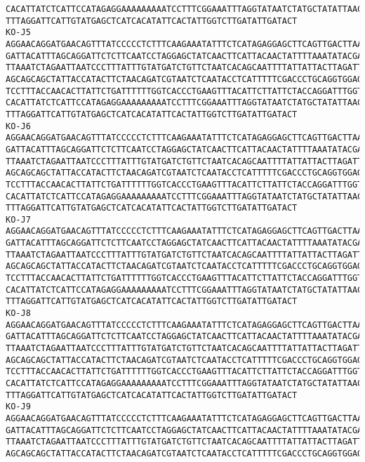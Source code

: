 \documentclass[11pt]{article}
\begin{document}
\begin{Verbatim}[commandchars=\\\{\}]
CACATTATCTCATTCCATAGAGGAAAAAAAAATCCTTTCGGAAATTTAGGTATAATCTATGCTATATTAACTATTGGAAT
TTTAGGATTCATTGTATGAGCTCATCACATATTCACTATTGGTCTTGATATTGATACT
KO-J5
AGGAACAGGATGAACAGTTTATCCCCCTCTTTCAAGAAATATTTCTCATAGAGGAGCTTCAGTTGACTTAAGAATCTTCA
GATTACATTTAGCAGGATTCTCTTCAATCCTAGGAGCTATCAACTTCATTACAACTATTTTAAATATACGACCAAAAAAC
TTAAATCTAGAATTAATCCCTTTATTTGTATGATCTGTTCTAATCACAGCAATTTTATTATTACTTAGATTACCAGTCTT
AGCAGCAGCTATTACCATACTTCTAACAGATCGTAATCTCAATACCTCATTTTTCGACCCTGCAGGTGGAGGAGACCCAA
TCCTTTACCAACACTTATTCTGATTTTTTGGTCACCCTGAAGTTTACATTCTTATTCTACCAGGATTTGGTATTATTTCT
CACATTATCTCATTCCATAGAGGAAAAAAAAATCCTTTCGGAAATTTAGGTATAATCTATGCTATATTAACTATTGGAAT
TTTAGGATTCATTGTATGAGCTCATCACATATTCACTATTGGTCTTGATATTGATACT
KO-J6
AGGAACAGGATGAACAGTTTATCCCCCTCTTTCAAGAAATATTTCTCATAGAGGAGCTTCAGTTGACTTAAGAATCTTCA
GATTACATTTAGCAGGATTCTCTTCAATCCTAGGAGCTATCAACTTCATTACAACTATTTTAAATATACGACCAAAAAAC
TTAAATCTAGAATTAATCCCTTTATTTGTATGATCTGTTCTAATCACAGCAATTTTATTATTACTTAGATTACCAGTCTT
AGCAGCAGCTATTACCATACTTCTAACAGATCGTAATCTCAATACCTCATTTTTCGACCCTGCAGGTGGAGGAGACCCAA
TCCTTTACCAACACTTATTCTGATTTTTTGGTCACCCTGAAGTTTACATTCTTATTCTACCAGGATTTGGTATTATTTCT
CACATTATCTCATTCCATAGAGGAAAAAAAAATCCTTTCGGAAATTTAGGTATAATCTATGCTATATTAACTATTGGAAT
TTTAGGATTCATTGTATGAGCTCATCACATATTCACTATTGGTCTTGATATTGATACT
KO-J7
AGGAACAGGATGAACAGTTTATCCCCCTCTTTCAAGAAATATTTCTCATAGAGGAGCTTCAGTTGACTTAAGAATCTTCA
GATTACATTTAGCAGGATTCTCTTCAATCCTAGGAGCTATCAACTTCATTACAACTATTTTAAATATACGACCAAAAAAC
TTAAATCTAGAATTAATCCCTTTATTTGTATGATCTGTTCTAATCACAGCAATTTTATTATTACTTAGATTACCAGTCTT
AGCAGCAGCTATTACCATACTTCTAACAGATCGTAATCTCAATACCTCATTTTTCGACCCTGCAGGTGGAGGAGACCCAA
TCCTTTACCAACACTTATTCTGATTTTTTGGTCACCCTGAAGTTTACATTCTTATTCTACCAGGATTTGGTATTATTTCT
CACATTATCTCATTCCATAGAGGAAAAAAAAATCCTTTCGGAAATTTAGGTATAATCTATGCTATATTAACTATTGGAAT
TTTAGGATTCATTGTATGAGCTCATCACATATTCACTATTGGTCTTGATATTGATACT
KO-J8
AGGAACAGGATGAACAGTTTATCCCCCTCTTTCAAGAAATATTTCTCATAGAGGAGCTTCAGTTGACTTAAGAATCTTCA
GATTACATTTAGCAGGATTCTCTTCAATCCTAGGAGCTATCAACTTCATTACAACTATTTTAAATATACGACCAAAAAAC
TTAAATCTAGAATTAATCCCTTTATTTGTATGATCTGTTCTAATCACAGCAATTTTATTATTACTTAGATTACCAGTCTT
AGCAGCAGCTATTACCATACTTCTAACAGATCGTAATCTCAATACCTCATTTTTCGACCCTGCAGGTGGAGGAGACCCAA
TCCTTTACCAACACTTATTCTGATTTTTTGGTCACCCTGAAGTTTACATTCTTATTCTACCAGGATTTGGTATTATTTCT
CACATTATCTCATTCCATAGAGGAAAAAAAAATCCTTTCGGAAATTTAGGTATAATCTATGCTATATTAACTATTGGAAT
TTTAGGATTCATTGTATGAGCTCATCACATATTCACTATTGGTCTTGATATTGATACT
KO-J9
AGGAACAGGATGAACAGTTTATCCCCCTCTTTCAAGAAATATTTCTCATAGAGGAGCTTCAGTTGACTTAAGAATCTTCA
GATTACATTTAGCAGGATTCTCTTCAATCCTAGGAGCTATCAACTTCATTACAACTATTTTAAATATACGACCAAAAAAC
TTAAATCTAGAATTAATCCCTTTATTTGTATGATCTGTTCTAATCACAGCAATTTTATTATTACTTAGATTACCAGTCTT
AGCAGCAGCTATTACCATACTTCTAACAGATCGTAATCTCAATACCTCATTTTTCGACCCTGCAGGTGGAGGAGACCCAA

\end{Verbatim}
\end{document}
